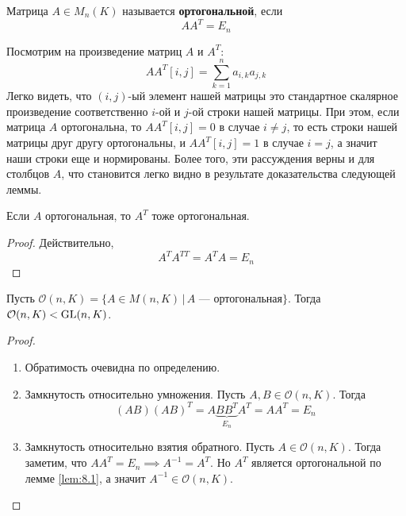 \documentclass[../main.tex]{subfiles}
\begin{document}
\begin{definition}
  Матрица $A \in M_n(K)$ называется \textbf{ортогональной}, если
  \begin{equation*}
    A A^{T} = E_n
  \end{equation*}
\end{definition}

\begin{remark}
  Посмотрим на произведение матриц $A$ и $A^T$:
  \begin{equation*}
    AA^{T}[i, j] = \sum\limits_{k = 1}^{n} a_{i,k} a_{j, k}
  \end{equation*}
  Легко видеть, что $(i, j)$-ый элемент нашей матрицы это стандартное скалярное произведение соответственно $i$-ой и $j$-ой строки нашей матрицы. При этом, если матрица $A$ ортогональна, то $AA^T[i, j] = 0$ в случае $i \neq j$, то есть строки нашей матрицы друг другу ортогональны, и $AA^T[i, j] = 1$ в случае $i = j$, а значит наши строки еще и нормированы. Более того, эти рассуждения верны и для столбцов $A$, что становится легко видно в результате доказательства следующей леммы.
\end{remark}

\begin{lemma}
\label{lem:8.1}
  Если $A$ ортогональная, то $A^T$ тоже ортогональная.
\end{lemma}
\begin{proof}
  Действительно,
  \begin{equation*}
    A^T A^{TT} = A^TA = E_n
  \end{equation*}
\end{proof}

\begin{theorem-non}
  Пусть $\mathcal{O}(n, K) = \{A \in M(n, K) \, | \, A\text{ --- ортогональная}\}$. Тогда $\mathcal{O}(n, K) < \operatorname{GL}(n, K)$.
\end{theorem-non}
\begin{proof}
  \begin{enumerate}
    \item Обратимость очевидна по определению.
    \item Замкнутость относительно умножения. Пусть $A, B \in \mathcal{O}(n, K)$. Тогда
    \begin{equation*}
      (AB)(AB)^T = A\underbrace{BB^T}_{E_n}A^T = AA^T = E_n
    \end{equation*}
    \item Замкнутость относительно взятия обратного. Пусть $A \in \mathcal{O}(n, K)$. Тогда заметим, что $AA^T = E_n \implies A^{-1} = A^T$. Но $A^T$ является ортогональной по лемме \ref{lem:8.1}, а значит $A^{-1} \in \mathcal{O}(n, K)$.
  \end{enumerate}
\end{proof}
\end{document}
